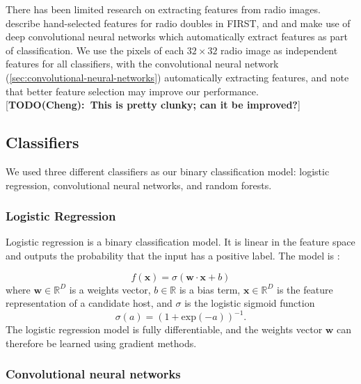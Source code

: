 \documentclass[fleqn,usenatbib,usedcolumn]{mnras}
\renewcommand{\vec}[1]{\mathbf{#1}}
\newcommand{\matthew}[2]{ {\color{white!20!violet}[{\bf TODO(#1):~{#2}}]} }
\begin{document}
    There has been limited research on extracting features from radio images.
    \citet{proctor06} describe hand-selected features for radio doubles in
    FIRST, and \citet{aniyan17cnn} and \citet{lukic17compact} make use of deep
    convolutional neural networks which automatically extract features as part
    of classification. We use the pixels of each $32 \times 32$ radio image as
    independent features for all classifiers, with the convolutional neural
    network (\autoref{sec:convolutional-neural-networks}) automatically
    extracting features, and note that better feature selection may improve our
    performance. \matthew{Cheng}{This is pretty clunky; can it be improved?}

  \subsection{Classifiers}\label{sec:classifiers}

    We used three different classifiers as our binary classification model:
    logistic regression, convolutional neural networks, and random forests.

    \subsubsection{Logistic Regression}
    \label{sec:logistic-regression}
      Logistic regression is a binary classification model. It is linear in the
      feature space and outputs the probability that the input has a positive
      label. The model is \citep{bishop06ml}:

      \begin{equation}
          f(\vec x) = \sigma(\vec w \cdot \vec x + b)
      \end{equation}
      where $\vec w \in \mathbb{R}^D$ is a weights vector,
      $b \in \mathbb{R}$ is a bias term, $\vec x \in \mathbb{R}^D$ is the
      feature representation of a candidate host, and $\sigma$ is the
      logistic sigmoid function \begin{equation}
          \sigma(a) = (1 + \mathrm{exp}(-a))^{-1}.
      \end{equation}%
      The logistic regression model is fully differentiable, and the weights
      vector $\vec w$ can therefore be learned using gradient methods.

    \subsubsection{Convolutional neural networks}
    \label{sec:convolutional-neural-networks}
\end{document}
